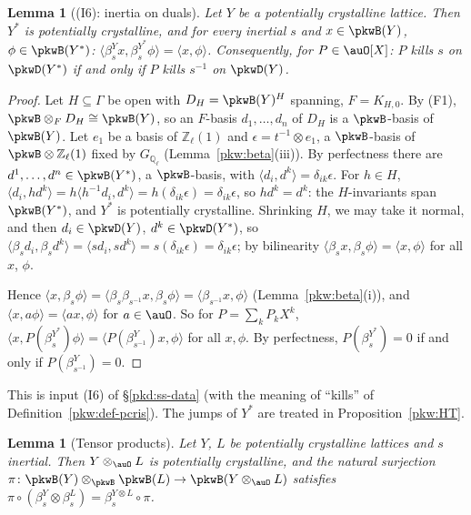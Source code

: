 \documentclass[10pt]{amsart}
\newtheorem{lemma}[theorem]{Lemma}
\theoremstyle{definition}
\theoremstyle{remark}
\newcommand{\Z}{\mathbb Z}
\newcommand{\Q}{\mathbb Q}
\begin{document}
\begin{lemma}[(I6): inertia on duals]\label{pkw:dual}
Let $Y$ be a potentially crystalline lattice. Then $Y^*$ is potentially crystalline, and for every
inertial $s$ and $x\in\pkwB(Y)$, $\phi\in\pkwB(Y^*)$: $\langle\beta^Y_sx,\beta^{Y^*}_s\phi\rangle=\langle
x,\phi\rangle$. Consequently, for $P\in\auO[X]$: $P$ kills $s$ on $\pkwD(Y^*)$ if and only if $P$ kills $s^{-1}$ on
$\pkwD(Y)$.
\end{lemma}

\begin{proof}
Let $H\subseteq\Gamma$ be open with $D_H=\pkwB(Y)^H$ spanning, $F=K_{H,0}$. By (F1), $\pkwB\otimes_FD_H\cong
\pkwB(Y)$, so an $F$-basis $d_1,\dots,d_n$ of $D_H$ is a $\pkwB$-basis of $\pkwB(Y)$. Let $e_1$ be a basis of
$\Z_\ell(1)$ and $\epsilon=t^{-1}\otimes e_1$, a $\pkwB$-basis of $\pkwB\otimes\Z_\ell(1)$ fixed by $G_{\Q_\ell}$
(Lemma~\ref{pkw:beta}(iii)). By perfectness there are $d^1,\dots,d^n\in\pkwB(Y^*)$, a $\pkwB$-basis, with
$\langle d_i,d^k\rangle=\delta_{ik}\epsilon$. For $h\in H$, $\langle d_i,hd^k\rangle=h\langle h^{-1}d_i,d^k\rangle=
h(\delta_{ik}\epsilon)=\delta_{ik}\epsilon$, so $hd^k=d^k$: the $H$-invariants span $\pkwB(Y^*)$, and $Y^*$ is
potentially crystalline. Shrinking $H$, we may take it normal, and then $d_i\in\pkwD(Y)$, $d^k\in\pkwD(Y^*)$,
so $\langle\beta_sd_i,\beta_sd^k\rangle=\langle sd_i,sd^k\rangle=s(\delta_{ik}\epsilon)=\delta_{ik}\epsilon$; by
bilinearity $\langle\beta_sx,\beta_s\phi\rangle=\langle x,\phi\rangle$ for all $x$, $\phi$.

Hence $\langle x,\beta_s\phi\rangle=\langle\beta_s\beta_{s^{-1}}x,\beta_s\phi\rangle=\langle\beta_{s^{-1}}x,\phi\rangle$
(Lemma~\ref{pkw:beta}(i)), and $\langle x,a\phi\rangle=\langle ax,\phi\rangle$ for $a\in\auO$. So for
$P=\sum_kP_kX^k$, $\langle x,P(\beta^{Y^*}_s)\phi\rangle=\langle P(\beta^Y_{s^{-1}})x,\phi\rangle$ for all $x,\phi$.
By perfectness, $P(\beta^{Y^*}_s)=0$ if and only if $P(\beta^Y_{s^{-1}})=0$.
\end{proof}

This is input (I6) of \S\ref{pkd:ss-data} (with the meaning of ``kills'' of
Definition~\ref{pkw:def-pcris}). The jumps of $Y^*$ are treated in Proposition~\ref{pkw:HT}.

\begin{lemma}[Tensor products]\label{pkw:tensor}
Let $Y$, $L$ be potentially crystalline lattices and $s$ inertial. Then $Y\otimes_\auO L$ is potentially
crystalline, and the natural surjection $\pi\colon\pkwB(Y)\otimes_{\pkwB}\pkwB(L)\to\pkwB(Y\otimes_\auO L)$
satisfies $\pi\circ(\beta^Y_s\otimes\beta^L_s)=\beta^{Y\otimes L}_s\circ\pi$.
\end{lemma}
\end{document}
